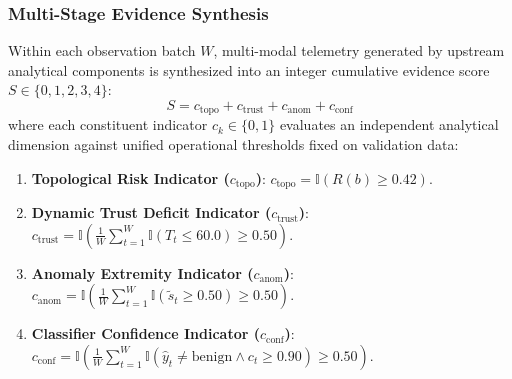 \documentclass[journal,10pt,onecolumn]{IEEEtran}
\begin{document}
\subsubsection{Multi-Stage Evidence Synthesis}
Within each observation batch $W$, multi-modal telemetry generated by upstream analytical components is synthesized into an integer cumulative evidence score $S \in \{0, 1, 2, 3, 4\}$:
$$S = c_{\text{topo}} + c_{\text{trust}} + c_{\text{anom}} + c_{\text{conf}}$$
where each constituent indicator $c_k \in \{0, 1\}$ evaluates an independent analytical dimension against unified operational thresholds fixed on validation data:
\begin{enumerate}
    \item \textbf{Topological Risk Indicator ($c_{\text{topo}}$)}: $c_{\text{topo}} = \mathbb{I}(R(b) \ge 0.42)$.
    \item \textbf{Dynamic Trust Deficit Indicator ($c_{\text{trust}}$)}: $c_{\text{trust}} = \mathbb{I}\left( \frac{1}{W}\sum_{t=1}^{W}\mathbb{I}(T_t \le 60.0) \ge 0.50 \right)$.
    \item \textbf{Anomaly Extremity Indicator ($c_{\text{anom}}$)}: $c_{\text{anom}} = \mathbb{I}\left( \frac{1}{W}\sum_{t=1}^{W}\mathbb{I}(\tilde{s}_t \ge 0.50) \ge 0.50 \right)$.
    \item \textbf{Classifier Confidence Indicator ($c_{\text{conf}}$)}: $c_{\text{conf}} = \mathbb{I}\left( \frac{1}{W}\sum_{t=1}^{W}\mathbb{I}(\hat{y}_t \neq \text{benign} \land c_t \ge 0.90) \ge 0.50 \right)$.
\end{enumerate}
\end{document}
